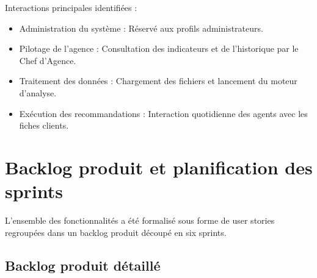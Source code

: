 Interactions principales identifiées :
\begin{itemize}
    \item Administration du système : Réservé aux profils administrateurs.
    \item Pilotage de l'agence : Consultation des indicateurs et de l'historique par le Chef d'Agence.
    \item Traitement des données : Chargement des fichiers et lancement du moteur d'analyse.
    \item Exécution des recommandations : Interaction quotidienne des agents avec les fiches clients.
\end{itemize}

\section{Backlog produit et planification des sprints}

L'ensemble des fonctionnalités a été formalisé sous forme de user stories regroupées dans un backlog produit découpé en six sprints.

\subsection{Backlog produit détaillé}

